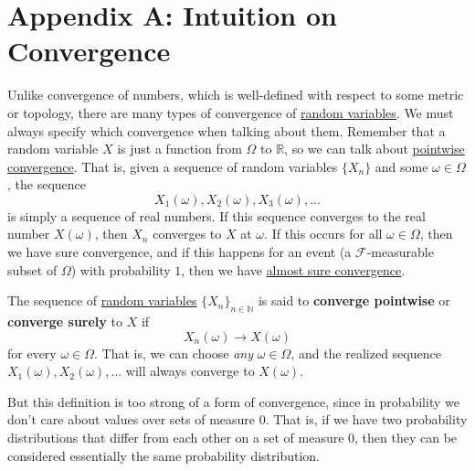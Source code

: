 \section*{Appendix A: Intuition on Convergence}

  Unlike convergence of numbers, which is well-defined with respect to some metric or topology, there are many types of convergence of \hyperref[def:random-variable]{random variables}. We must always specify which convergence when talking about them. Remember that a random variable $X$ is just a function from $\Omega$ to $\mathbb{R}$, so we can talk about \hyperref[real-def:pointwise-convergence]{pointwise convergence}. That is, given a sequence of random variables $\{X_n\}$ and some $\omega \in \Omega$, the sequence 
  \begin{equation}
    X_1(\omega), X_2 (\omega), X_3(\omega), \ldots
  \end{equation}
  is simply a sequence of real numbers. If this sequence converges to the real number $X(\omega)$, then $X_n$ converges to $X$ at $\omega$. If this occurs for all $\omega \in \Omega$, then we have sure convergence, and if this happens for an event (a $\mathcal{F}$-measurable subset of $\Omega$) with probability $1$, then we have \hyperref[mt-def:almost-sure-convergence]{almost sure convergence}. 

  \begin{definition}
    \label{def:sure-convergence-of-rvs}
    The sequence of \hyperref[def:random-variable]{random variables} $\{ X_n\}_{n \in \mathbb{N}}$ is said to \textbf{converge pointwise} or \textbf{converge surely} to $X$ if 
    \begin{equation}
      X_n (\omega) \rightarrow X (\omega)
    \end{equation}
    for every $\omega \in \Omega$. That is, we can choose \textit{any} $\omega \in \Omega$, and the realized sequence $X_1 (\omega), X_2 (\omega), \ldots$ will always converge to $X(\omega)$. 
  \end{definition}

  But this definition is too strong of a form of convergence, since in probability we don't care about values over sets of measure $0$. That is, if we have two probability distributions that differ from each other on a set of measure $0$, then they can be considered essentially the same probability distribution. 


